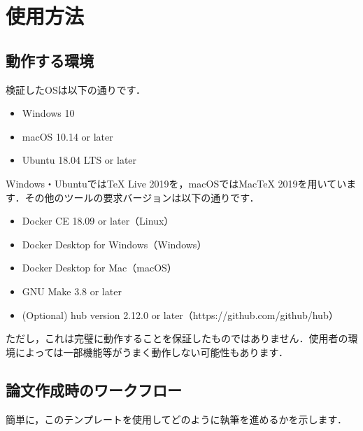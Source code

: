 \documentclass[main]{subfiles}
\begin{document}
\section{使用方法}

\subsection{動作する環境}

検証したOSは以下の通りです．

\begin{itemize}
    \item Windows 10
    \item macOS 10.14 or later
    \item Ubuntu 18.04 LTS or later
\end{itemize}

Windows・UbuntuではTeX Live 2019を，macOSではMacTeX 2019を用いています．その他のツールの要求バージョンは以下の通りです．

\begin{itemize}
    \item Docker CE 18.09 or later（Linux）
    \item Docker Desktop for Windows（Windows）
    \item Docker Desktop for Mac（macOS）
    \item GNU Make 3.8 or later
    \item (Optional) hub version 2.12.0 or later（https://github.com/github/hub）
\end{itemize}

ただし，これは完璧に動作することを保証したものではありません．使用者の環境によっては一部機能等がうまく動作しない可能性もあります．

\subsection{論文作成時のワークフロー}

簡単に，このテンプレートを使用してどのように執筆を進めるかを示します．
\end{document}
